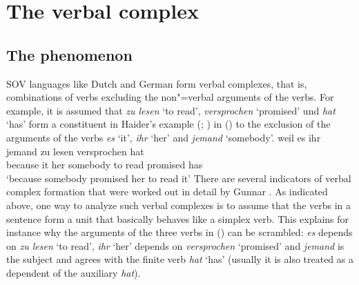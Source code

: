 
\chapter{The verbal complex}
\label{chap-verbal-complex}


\section{The phenomenon}

SOV languages like Dutch and German form verbal complexes, that is, combinations of verbs excluding
the non"=verbal arguments of the verbs. For example, it is assumed that \emph{zu lesen} `to read',
\emph{versprochen} `promised' und \emph{hat} `has' form a constituent in Haider's example (\citeyear[]{Haider86c}; \citeyear[]{Haider90b}) in () to the exclusion of the arguments of the verbs
\emph{es} `it', \emph{ihr} `her' and \emph{jemand} `somebody'.
\ea\label{ex-weil-es-ihr-jemand-zu-lesen-versprochen-hat}
\gll weil es ihr jemand zu lesen versprochen hat\\
     because it her somebody to read promised has\\
\glt `because somebody promised her to read it'
\z
There are several indicators of verbal complex formation
that were worked out in detail by Gunnar \citet{Bech55a}. As indicated above, one way to analyze such verbal
complexes is to assume that the verbs in a sentence form a unit that basically behaves like a
simplex verb. This explains for instance why the arguments of the three verbs in () can be scrambled:
\emph{es} depends on \emph{zu lesen} `to read', \emph{ihr} `her' depends on \emph{versprochen}
`promised' and \emph{jemand} is the subject and agrees with the finite verb \emph{hat} `has'
(usually it is also treated as a dependent of the auxiliary \emph{hat}).

